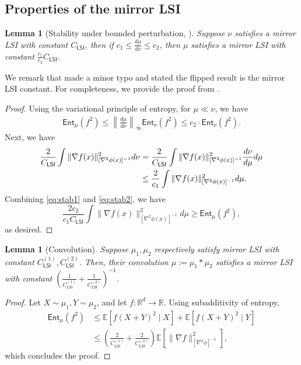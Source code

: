 \documentclass{article}
\newtheorem{lemma}[theorem]{Lemma}
\newcommand{\CLSI}[0]{C_{\mathsf{LSI}}}
\newcommand{\Ent}[0]{\mathsf{Ent}}
\newcommand{\R}[0]{\mathbb{R}}
\newcommand{\E}[0]{\mathbb{E}}
\begin{document}
\subsection{Properties of the mirror LSI}
\begin{lemma}[Stability under bounded perturbation, {\citet[Lemma 2]{jiang2021mirror}}]
    Suppose $\nu$ satisfies a mirror LSI with constant $\CLSI$, then if $c_1 \le \frac{d\mu}{d\nu}\le c_2$, then $\mu$ satisfies a mirror LSI with constant $\frac{c_1}{c_2}\CLSI$.
\end{lemma}
We remark that \citet{jiang2021mirror} made a minor typo and stated the flipped result is the mirror LSI constant. For completeness, we provide the proof from \cite{jiang2021mirror}.
\begin{proof}
    Using the variational principle of entropy, for $\mu\ll \nu$, we have \begin{align}
    \mathsf{Ent}_\mu(f^2) \le \left\|\frac{d\mu}{d\nu}\right\|_\infty\mathsf{Ent}_\nu(f^2) \le c_2\cdot \mathsf{Ent}_\nu(f^2).   \label{eq:stab1}     
    \end{align}
    Next, we have \begin{align}
        \frac{2}{\CLSI}\int\|\nabla f(x)\|^2_{[\nabla^2\phi(x)]^{-1}}d\nu &= \frac{2}{\CLSI}\int\|\nabla f(x)\|^2_{[\nabla^2\phi(x)]^{-1}}\frac{d\nu}{d\mu}d\mu\notag\\
        &\le \frac{2}{c_1}\int\|\nabla f(x)\|^2_{[\nabla^2\phi(x)]^{-1}}d\mu.\label{eq:stab2}
    \end{align}
    Combining \eqref{eq:stab1} and \eqref{eq:stab2}, we have \[
    \frac{2c_2}{c_1\CLSI}\int\|\nabla f(x)\|^2_{[\nabla^2\phi(x)]^{-1}}d\mu \ge \mathsf{Ent}_\mu(f^2),
    \]
    as desired.
\end{proof}

\begin{lemma}[Convolution]
    Suppose $\mu_1, \mu_2$ respectively satisfy mirror LSI with constant $\CLSI^{(1)}, \CLSI^{(2)}$. Then, their convolution $\mu := \mu_1 * \mu_2$ satisfies a mirror LSI with constant $\left(\frac1{\CLSI^{(1)}}+\frac1{\CLSI^{(2)}}\right)^{-1}$.
\end{lemma}
\begin{proof}
    Let $X\sim \mu_1, Y\sim \mu_2$, and let $f:\R^d\to\R$. Using subadditivity of entropy, \begin{align*}
        \Ent_\mu(f^2)&\le \E[f(X+Y)^2\mid X] + \E[f(X+Y)^2\mid Y]\\
        &\le \left(\frac{2}{\CLSI^{(1)}}+\frac{2}{\CLSI^{(2)}}\right)\E[\|\nabla f\|_{[\nabla^2\phi]^{-1}}^2],
    \end{align*}
which concludes the proof.
\end{proof}
\end{document}
